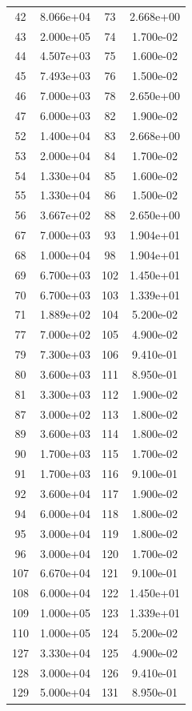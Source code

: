 \documentclass[12pt]{article}
\begin{document}
\begin{longtable}{@{}cccc@{}}
42 & 8.066e+04 & 73 & 2.668e+00 \\
43 & 2.000e+05 & 74 & 1.700e-02 \\
44 & 4.507e+03 & 75 & 1.600e-02 \\
45 & 7.493e+03 & 76 & 1.500e-02 \\
46 & 7.000e+03 & 78 & 2.650e+00 \\
47 & 6.000e+03 & 82 & 1.900e-02 \\
52 & 1.400e+04 & 83 & 2.668e+00 \\
53 & 2.000e+04 & 84 & 1.700e-02 \\
54 & 1.330e+04 & 85 & 1.600e-02 \\
55 & 1.330e+04 & 86 & 1.500e-02 \\
56 & 3.667e+02 & 88 & 2.650e+00 \\
67 & 7.000e+03 & 93 & 1.904e+01 \\
68 & 1.000e+04 & 98 & 1.904e+01 \\
69 & 6.700e+03 & 102 & 1.450e+01 \\
70 & 6.700e+03 & 103 & 1.339e+01 \\
71 & 1.889e+02 & 104 & 5.200e-02 \\
77 & 7.000e+02 & 105 & 4.900e-02 \\
79 & 7.300e+03 & 106 & 9.410e-01 \\
80 & 3.600e+03 & 111 & 8.950e-01 \\
81 & 3.300e+03 & 112 & 1.900e-02 \\
87 & 3.000e+02 & 113 & 1.800e-02 \\
89 & 3.600e+03 & 114 & 1.800e-02 \\
90 & 1.700e+03 & 115 & 1.700e-02 \\
91 & 1.700e+03 & 116 & 9.100e-01 \\
92 & 3.600e+04 & 117 & 1.900e-02 \\
94 & 6.000e+04 & 118 & 1.800e-02 \\
95 & 3.000e+04 & 119 & 1.800e-02 \\
96 & 3.000e+04 & 120 & 1.700e-02 \\
107 & 6.670e+04 & 121 & 9.100e-01 \\
108 & 6.000e+04 & 122 & 1.450e+01 \\
109 & 1.000e+05 & 123 & 1.339e+01 \\
110 & 1.000e+05 & 124 & 5.200e-02 \\
127 & 3.330e+04 & 125 & 4.900e-02 \\
128 & 3.000e+04 & 126 & 9.410e-01 \\
129 & 5.000e+04 & 131 & 8.950e-01 \\

\end{longtable}
\end{document}
